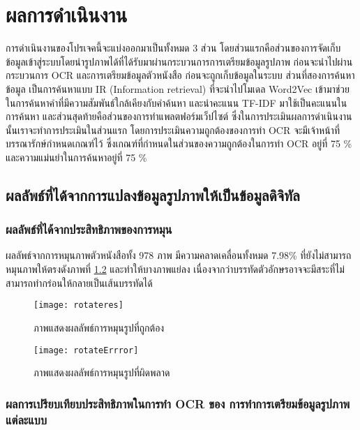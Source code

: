 \chapter{ผลการดำเนินงาน}

การดำเนินงานของโปรเจคนี้จะแบ่งออกมาเป็นทั้งหมด 3 ส่วน โดยส่วนแรกคือส่วนของการจัดเก็บข้อมูลเข้าสู่ระบบโดยนำรูปภาพได้ที่ได้รับมาผ่านกระบวนการการเตรียมข้อมูลรูปภาพ 
ก่อนจะนำไปผ่านกระบวนการ OCR และการเตรียมข้อมูลตัวหนังสือ ก่อนจะถูกเก็บข้อมูลในระบบ ส่วนที่สองการค้นหาข้อมูล เป็นการค้นหาแบบ IR (Information retrieval) 
ที่จะนำไปโมเดล Word2Vec เข้ามาช่วยในการค้นหาคำที่มีความสัมพันธ์ใกล้เคียงกับคำค้นหา และนำคะแนน TF-IDF มาใช้เป็นคะแนนในการค้นหา และส่วนสุดท้ายคือส่วนของการทำแพลตฟอร์มเว็ปไซต์
ซึ่งในการประเมินผลการดำเนินงานนั้นเราจะทำการประเมินในส่วนแรก โดยการประเมินความถูกต้องของการทำ OCR จะมีเจ้าหน้าที่บรรณารักษ์กำหนดเกณฑ์ไว้ 
ซึ่งเกณฑ์ที่กำหนดในส่วนของความถูกต้องในการทำ OCR อยู่ที่ 75 \% และความแม่นยำในการค้นหาอยู่ที่ 75 \%

\section{ผลลัพธ์ที่ได้จากการแปลงข้อมูลรูปภาพให้เป็นข้อมูลดิจิทัล}

\subsection{ผลลัพธ์ที่ได้จากประสิทธิภาพของการหมุน}
ผลลัพธ์จากการหมุนภาพตัวหนังสือทั้ง 978 ภาพ มีความคลาดเคลื่อนทั้งหมด 7.98\% ที่ยังไม่สามารถหมุนภาพให้ตรงดังภาพที่ \ref{fig:rotateErrror} 
และทำให้บางภาพแย่ลง เนื่องจากว่าบรรทัดตัวอักษรอาจจะมีสระที่ไม่สามารถทำกร่อนให้กลายเป็นเส้นบรรทัดได้

\begin{figure}[H]
    \centering
    \texttt{[image: rotateres]}
    \caption{ภาพแสดงผลลัพธ์การหมุนรูปที่ถูกต้อง}\label{fig:rotateres}
\end{figure}

\begin{figure}[H]
    \centering
    \texttt{[image: rotateErrror]}
    \caption{ภาพแสดงผลลัพธ์การหมุนรูปที่ผิดพลาด}\label{fig:rotateErrror}
\end{figure}

\subsection{ผลการเปรียบเทียบประสิทธิภาพในการทำ OCR ของ การทำการเตรียมข้อมูลรูปภาพ แต่ละแบบ}


